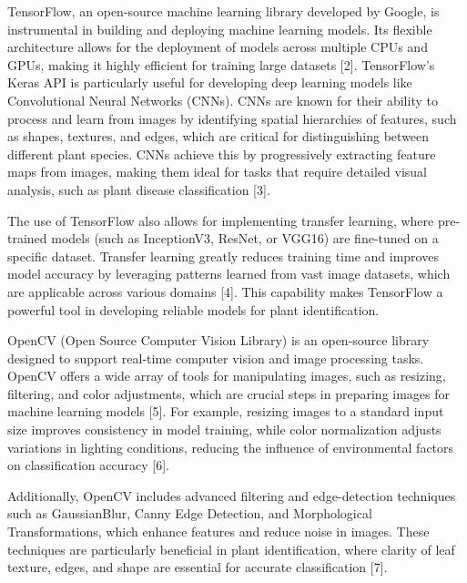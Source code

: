 \begin{multicols}{2}
TensorFlow, an open-source machine learning library developed by Google,
is instrumental in building and deploying machine learning models. Its
flexible architecture allows for the deployment of models across
multiple CPUs and GPUs, making it highly efficient for training large
datasets {[}2{]}. TensorFlow's Keras API is particularly useful for
developing deep learning models like Convolutional Neural Networks
(CNNs). CNNs are known for their ability to process and learn from
images by identifying spatial hierarchies of features, such as shapes,
textures, and edges, which are critical for distinguishing between
different plant species. CNNs achieve this by progressively extracting
feature maps from images, making them ideal for tasks that require
detailed visual analysis, such as plant disease classification {[}3{]}.

The use of TensorFlow also allows for implementing transfer learning,
where pre-trained models (such as InceptionV3, ResNet, or VGG16) are
fine-tuned on a specific dataset. Transfer learning greatly reduces
training time and improves model accuracy by leveraging patterns learned
from vast image datasets, which are applicable across various domains
{[}4{]}. This capability makes TensorFlow a powerful tool in developing
reliable models for plant identification.

OpenCV (Open Source Computer Vision Library) is an open-source library
designed to support real-time computer vision and image processing
tasks. OpenCV offers a wide array of tools for manipulating images, such
as resizing, filtering, and color adjustments, which are crucial steps
in preparing images for machine learning models {[}5{]}. For example,
resizing images to a standard input size improves consistency in model
training, while color normalization adjusts variations in lighting
conditions, reducing the influence of environmental factors on
classification accuracy {[}6{]}.

Additionally, OpenCV includes advanced filtering and edge-detection
techniques such as GaussianBlur, Canny Edge Detection, and Morphological
Transformations, which enhance features and reduce noise in images.
These techniques are particularly beneficial in plant identification,
where clarity of leaf texture, edges, and shape are essential for
accurate classification {[}7{]}.
\end{multicols}

